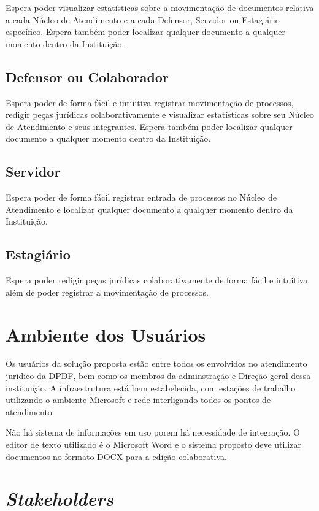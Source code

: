 \documentclass[12pt,a4paper]{report}
\begin{document}
Espera poder visualizar estatísticas sobre a movimentação de documentos relativa a cada Núcleo de Atendimento e a cada Defensor, Servidor ou Estagiário específico. Espera também poder localizar qualquer documento a qualquer momento dentro da Instituição.

\subsection{Defensor ou Colaborador}

Espera poder de forma fácil e intuitiva registrar movimentação de processos, redigir peças jurídicas colaborativamente e visualizar estatísticas sobre seu Núcleo de Atendimento e seus integrantes. Espera também poder localizar qualquer documento a qualquer momento dentro da Instituição. 

\subsection{Servidor}

Espera poder de forma fácil registrar entrada de processos no Núcleo de Atendimento e localizar qualquer documento a qualquer momento dentro da Instituição.

\subsection{Estagiário}

Espera poder redigir peças jurídicas colaborativamente de forma fácil e intuitiva, além de poder registrar a movimentação de processos.

\section{Ambiente dos Usuários}

Os usuários da solução proposta estão entre todos os envolvidos no atendimento jurídico da DPDF, bem como os membros da adminstração e Direção geral dessa instituição. A infraestrutura está bem estabelecida, com estações de trabalho utilizando o ambiente Microsoft e rede interligando todos os pontos de atendimento.

Não há sistema de informações em uso porem há necessidade de integração. O editor de texto utilizado é o Microsoft Word e o sistema proposto deve utilizar documentos no formato DOCX para a edição colaborativa.

\section{\textit{Stakeholders}}
\end{document}
